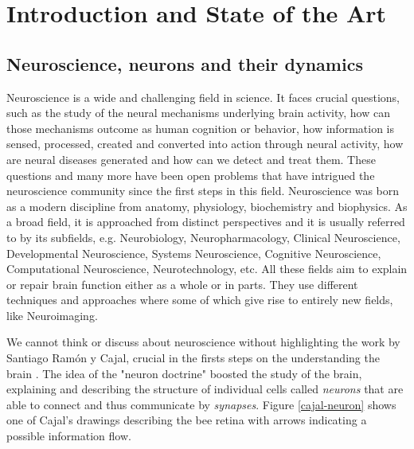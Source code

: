 \chapter{Introduction and State of the Art}
\label{c-intro}

\section{Neuroscience, neurons and their dynamics}
Neuroscience is a wide and challenging field in science. It faces crucial questions, such as the study of the neural mechanisms underlying brain activity, how can those mechanisms outcome as human cognition or behavior, how information is sensed, processed, created and converted into action through neural activity, how are neural diseases generated and how can we detect and treat them. 
These questions and many more have been open problems that have intrigued the neuroscience community since the first steps in this field. Neuroscience was born as a modern discipline from anatomy, physiology, biochemistry and biophysics. As a broad field, it is approached from distinct perspectives and it is usually referred to by its subfields, e.g. Neurobiology, Neuropharmacology, Clinical Neuroscience, Developmental Neuroscience, Systems Neuroscience, Cognitive Neuroscience, Computational Neuroscience, Neurotechnology, etc. All these fields aim to explain or repair brain function either as a whole or in parts. They use different techniques and approaches where some of which give rise to entirely new fields, like Neuroimaging.

We cannot think or discuss about neuroscience without highlighting the work by Santiago Ramón y Cajal, crucial in the firsts steps on the understanding the brain  \parencite{ramonycajal_textura_1899,decarlos_historical_2007,decastro_editorial_2016,delgado-garcia_cajal_2015,decastro_cajal_2019}. The idea of the "neuron doctrine" boosted the study of the brain, explaining and describing the structure of individual cells called \textit{neurons} that are able to connect and thus communicate by \textit{synapses}. Figure \ref{cajal-neuron} shows one of Cajal's drawings describing the bee retina with arrows indicating a possible information flow.

